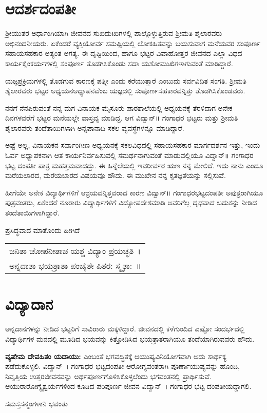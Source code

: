 {\section*{ಆದರ್ಶದಂಪತೀ}
\vskip -6pt

ಶ್ರೀಯುತರ ಅರ್ಧಾಂಗಿಯಾಗಿ ಜೀವನದ ಸುಖ\enginline{-}ದುಃಖಗಳಲ್ಲಿ ಪಾಲ್ಗೊಳ್ಳುತ್ತಿರುವ ಶ್ರೀಮತಿ ಶೈಲಾರವರು ಅಭಿನಂದನೀಯರು. ಏಕೆಂದರೆ ವ್ಯಕ್ತಿಯೋರ್ವ ಸಮಷ್ಟಿಯಲ್ಲಿ ಲೋಕಹಿತವನ್ನು ಬಯಸುವಾಗ ಮನೆಯವರ ಸಂಪೂರ್ಣ ಸಹಾಯ\enginline{-}ಸಹಕಾರ ಅತ್ಯಂತ ಅಗತ್ಯ. ಈ ದೃಷ್ಟಿಯಿಂದ, ಹಾಗೂ ಭಟ್ಟರ ವಿವಾಹೋತ್ತರ ಜೀವನದ ಎಲ್ಲಾ ವಿಧದ ಕಾರ್ಯಕೈಂಕರ್ಯಗಳಲ್ಲಿ ಸಂಪೂರ್ಣ ತೊಡಗಿಸಿಕೊಂಡು ಸದಾ ಯಶೋಮುಖಿಗಳಾಗುವಂತೆ ಮಾಡಿದ್ದಾರೆ. 

ಯಜ್ಞಪ್ರಕ್ರಿಯಗಳಲ್ಲಿ ತೊಡಗುವ ಕಾರಣಕ್ಕೆ ಪತ್ನೀ ಎಂದು ಕರೆಯುತ್ತಾರೆ ಎಂಬುದು ಸರ್ವವಿದಿತ ಸಂಗತಿ. ಶ್ರೀಮತಿ ಶೈಲಾರವರು ಭಟ್ಟರ ಅಧ್ಯಯನ\enginline{-}ಅಧ್ಯಾಪನವೆಂಬ ಯಜ್ಞದಲ್ಲಿ ಸಂಪೂರ್ಣಸಹಕಾರವನ್ನಿತ್ತು ತೊಡಗಿಸಿಕೊಂಡವರು. 									

ನನಗೆ ನೆನಪಿರುವಂತೆ ನನ್ನ ಮಗ ವಿನಾಯಕ ಮೈಸೂರು ಪಾಠಶಾಲೆಯಲ್ಲಿ ಅಧ್ಯಯ\-ನಕ್ಕೆ ತೆರಳಿದಾಗ ಅನೇಕ ದಿನಗಳವರೆಗೆ ಭಟ್ಟರ ಮನೆಯಲ್ಲೇ ವಾಸ್ತವ್ಯ ಮಾಡಿದ್ದ. ಆಗ ವಿದ್ವಾನ್॥ ಗಂಗಾಧರ ಭಟ್ಟರು ಮತ್ತು ಶ್ರೀಮತಿ ಶೈಲಾರವರು ತಂದೆ\enginline{-}ತಾಯಿಗಳಾಗಿ ಅನ್ನಪಾನಾದಿ ಸಕಲ ವ್ಯವಸ್ಥೆಗಳನ್ನೂ ಮಾಡಿದ್ದಾರೆ. 

ಅಷ್ಟೆ ಅಲ್ಲ, ವಿನಾಯಕನ ಸರ್ವಾಂಗೀಣ ಅಧ್ಯಯನಕ್ಕೆ ಸಕಲವಿಧದಲ್ಲಿ ಸಹಾಯ\enginline{-}ಸಹಕಾರ  \enginline{-}  ಮಾರ್ಗ\-ದರ್ಶನ ಇತ್ತು, ಇಂದು ಓರ್ವ ಅಧ್ಯಾಪಕನಾಗಿ ಆತ ಕಾರ್ಯ\-ನಿರ್ವಹಿಸುವಲ್ಲಿ ಸಮರ್ಥನಾಗುವಂತೆ ಮಾಡುವಲ್ಲಿಯೂ ವಿದ್ವಾನ್॥ ಗಂಗಾಧರ ಭಟ್ಟ ದಂಪತೀ ಪಾತ್ರ ಮಹತ್ತಮವಾದದ್ದು. ಈ ಹಿನ್ನೆಲೆಯಲ್ಲಿ ಇವರೀರ್ವರ ಋಣ ನನ್ನ ಮೇಲಿದೆ. ಇದು ನಾನು ಎಂದೂ ಮರೆಯಲಾರದ, ಮರೆಯಬಾರದ ವಿಷಯವೂ ಹೌದು. ಈ ಮುಖೇನ ನನ್ನ ಕೃತಜ್ಞತೆಯನ್ನು ಸಲ್ಲಿಸುವೆ. 

ಹೀಗೆಯೇ ಅನೇಕ ವಿದ್ಯಾರ್ಥಿಗಳಿಗೆ ಆಶ್ರಯವನ್ನಿತ್ತವರಾದ ಕಾರಣ ವಿದ್ವಾನ್॥ ಗಂಗಾಧರಭಟ್ಟದಂಪತೀ ಅಪುತ್ರರಾಗಿಯೂ ಪುತ್ರವಂತರು, ಏಕೆಂದರೆ ನೂರಾರು ವಿದ್ಯಾರ್ಥಿ\-ಗಳಿಗೆ ವಿದ್ಯೋಪದೇಶಮಾಡಿ ಅವರಿಗೆಲ್ಲ ದೃಢವಾದ ಬದುಕನ್ನು ನೀಡಿದ ತಂದೆತಾಯಿಗಳಾಗಿದ್ದಾರೆ. 					

ಪ್ರಸಿದ್ಧವಾದ ಮಾತೊಂದು ಹೀಗಿದೆ  \enginline{-}   
\vskip -5pt

\begin{tabular}{>{\hspace{0.8cm}}l}
ಜನಿತಾ ಚೋಪನೀತಾಚ ಯಶ್ಚ ವಿದ್ಯಾಂ ಪ್ರಯಚ್ಛತಿ~।\\
ಅನ್ನದಾತಾ ಭಯತ್ರಾತಾ ಪಂಚೈತೇ ಪಿತರ: ಸ್ಮೃತಾ:~॥ 		
\end{tabular}

\section*{ವಿದ್ಯಾದಾನ   \eng{-}} 

ಅನ್ನದಾನಗಳನ್ನು ನೀಡಿದ ಭಟ್ಟರಿಗೆ ಸಾವಿರಾರು ಮಕ್ಕಳಿದ್ದಾರೆ. ಜೀವನದಲ್ಲಿ ಕಳೆಗುಂದಿದ ಎಷ್ಟೋ ಸಂದರ್ಭದಲ್ಲಿ ವಿದ್ಯಾರ್ಥಿಗಳ ಮನದಲ್ಲಿ ಮೂಡಿದ ಭಯವನ್ನು ಕಿತ್ತೋಡಿಸಿದ ಭಯತ್ರಾತರಾಗಿಯೂ ತಂದೆಯಾಗಿರುವವರು ಹೌದು.

\textbf{ವ್ಯಷೇಮ ದೇವಹಿತಂ ಯದಾಯು:} ಎಂಬಂತೆ ಭಗವದ್ಧಿತಕ್ಕೆ ಆಯುಷ್ಯವಿನಿಯೋಗ\-ವಾಗಿ ಅದು ಸಾರ್ಥಕ್ಯ ಪಡೆದುಕೊಳ್ಳಲಿ. ವಿದ್ವಾನ್~। ಗಂಗಾಧರ ಭಟ್ಟದಂಪತೀ ಆರೋಗ್ಯವಂತರಾಗಿ ಪೂರ್ಣಾಯುಷ್ಯವನ್ನು ಹೊಂದಿ, ನಿವೃತ್ತಿಯ ಉತ್ತರಜೀವನವನ್ನು ಅರ್ಥಪೂರ್ಣಗೊಳಿಸಿಕೊಳ್ಳಲೆಂದು ಭಗವಂತನಲ್ಲಿ ಪ್ರಾರ್ಥಿಸುವೆ. ಆಯುರಾರೋಗ್ಯೈಶ್ವರ್ಯಗಳಿಂದ ಕೂಡಿದ ಪರಿಪೂರ್ಣ ಜೀವನ ವಿದ್ವಾನ್~। ಗಂಗಾಧರ ಭಟ್ಟ ದಂಪತೀಯದ್ದಾಗಲಿ. 

\centerline{ಸಮಸ್ತಸನ್ಮಂಗಳಾನಿ ಭವಂತು}

\articleend
}
